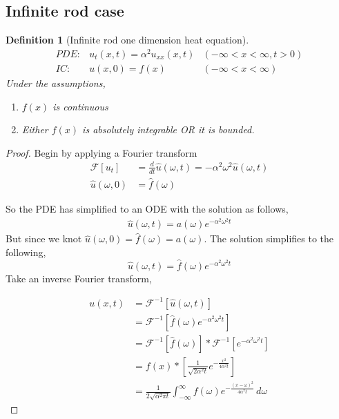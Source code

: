 \documentclass[oneside,11pt,pdftex,final]{book}%
\numberwithin{equation}{section}
\newtheorem{definition}[theorem]{Definition}
\numberwithin{section}{chapter}
\numberwithin{equation}{chapter}
\begin{document}
\subsection{Infinite rod case}
\begin{definition}[Infinite rod one dimension heat equation]
	\begin{align*}
		PDE:& u_t(x,t)=\alpha^2u_{xx}(x,t) &(-\infty<x<\infty, t>0)\\
		IC:& u(x,0)=f(x)& (-\infty<x<\infty)
	\end{align*}
	Under the assumptions,
	\begin{enumerate}
		\item $ f(x) $ is continuous
		\item Either $ f(x) $ is absolutely integrable OR it is bounded.
	\end{enumerate}
\end{definition}
\begin{proof}
	Begin by applying a	 Fourier transform
	\begin{align*}
		\mathcal{F}[u_t]&=\frac{d}{dt}\hat{u}(\omega,t)=-\alpha^2\omega^2 \hat{u}(\omega,t)\\
		\hat{u}(\omega,0)&=\hat{f}(\omega)
	\end{align*}
	
	So the PDE has simplified to an ODE with the solution as follows,
	\begin{align*}
		\hat{u}(\omega, t)= a(\omega)e^{-\alpha^2 \omega^2 t}
	\end{align*}
	But since we knot $ \hat{u}(\omega, 0) =\hat{f}(\omega)=a(\omega)$. The solution simplifies to the following,
	\[ \hat{u}(\omega,t )=\hat{f}(\omega)e^{-\alpha^2 \omega^2 t} \]
	Take an inverse Fourier transform,
	
	\begin{align*}
		u(x,t)&=\mathcal{F}^{-1}[\hat{u}(\omega,t)]\\
		&=\mathcal{F}^{-1}[\hat{f}(\omega)e^{-\alpha^2\omega^2 t}]\\
		&=\mathcal{F}^{-1}[\hat{f}(\omega)]*\mathcal{F}^{-1}[e^{-\alpha^2 \omega^2 t}]\\
		&=f(x)*\left[\frac{1}{\sqrt{2 \alpha^2 t}}e^{-\frac{x^2}{4\alpha^2t}}\right]\\
		&=\frac{1}{2\sqrt{\alpha^2\pi t}}\int_{-\infty}^\infty f(\omega)e^{-\frac{(x-\omega)^2}{4 \alpha^2 t}}\, d\omega
	\end{align*}
\end{proof}
\end{document}
